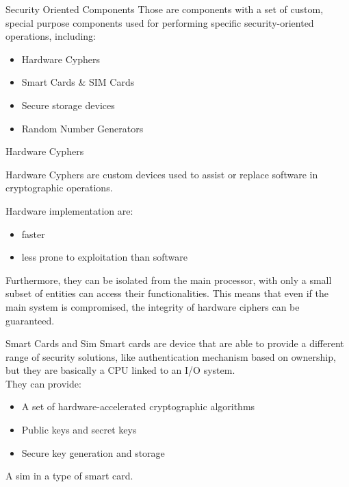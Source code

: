 \begin{section}{Security Oriented Components}
  Those are components with a set of custom, special purpose components used for performing specific
  security-oriented operations, including:
  \begin{itemize}
    \item Hardware Cyphers
    \item Smart Cards \& SIM Cards
    \item Secure storage devices
    \item Random Number Generators
  \end{itemize}

  \begin{subsection}{Hardware Cyphers}
    \begin{boxH}
      Hardware Cyphers are custom devices used to assist or replace software in cryptographic
      operations.
    \end{boxH}
    Hardware implementation are:
    \begin{itemize}
      \item faster
      \item less prone to exploitation than software
    \end{itemize}
    Furthermore, they can be isolated from the main processor, with only a small subset of entities
    can access their functionalities. This means that even if the main system is compromised, the
    integrity of hardware ciphers can be guaranteed.
  \end{subsection}

  \begin{subsection}{Smart Cards and Sim}
    Smart cards are device that are able to provide a different range of security solutions, like
    authentication mechanism based on ownership, but they are basically a CPU linked to an I/O
    system.\\
    They can provide:
    \begin{itemize}
      \item A set of hardware-accelerated cryptographic algorithms
      \item Public keys and secret keys
      \item Secure key generation and storage
    \end{itemize}
    A sim in a type of smart card.
  \end{subsection}


\end{section}
